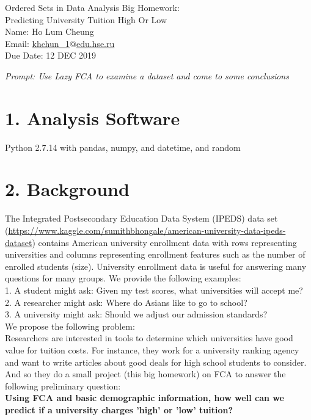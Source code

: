 \documentclass[12pt, a4, epsf] {article}
\theoremstyle{plain}
\theoremstyle{definition}
\begin{document}
\begin{center}

{\Large Ordered Sets in Data Analysis Big Homework:\\Predicting University Tuition High Or Low\\}
Name: Ho Lum Cheung \\
Email: \href{mailto:khchun_1@edu.hse.ru}{khchun\_1$@$edu.hse.ru}\\
Due Date: 12 DEC 2019\\
\end{center}
\pagestyle{fancy}
\textit{Prompt: Use Lazy FCA to examine a dataset and come to some conclusions}
\section*{1. Analysis Software}
Python 2.7.14 with pandas, numpy, and datetime, and random
\section*{2. Background}
The Integrated Postsecondary Education Data System (IPEDS) data set (\href{https://www.kaggle.com/sumithbhongale/american-university-data-ipeds-dataset}{https://www.kaggle.com/sumithbhongale/american-university-data-ipeds-dataset}) contains American university enrollment data with rows representing universities and columns representing enrollment features such as the number of enrolled students (size). University enrollment data is useful for answering many questions for many groups. We provide the following examples:\\
1. A student might ask: Given my test scores, what universities will accept me?\\
2. A researcher might ask: Where do Asians like to go to school?\\
3. A university might ask: Should we adjust our admission standards?\\
We propose the following problem:\\
Researchers are interested in tools to determine which universities have good value for tuition costs. For instance, they work for a university ranking agency and want to write articles about good deals for high school students to consider. And so they do a small project (this big homework) on FCA to answer the following preliminary question:\\
\textbf{Using FCA and basic demographic information, how well can we predict if a university charges 'high' or 'low' tuition?}
\end{document}
